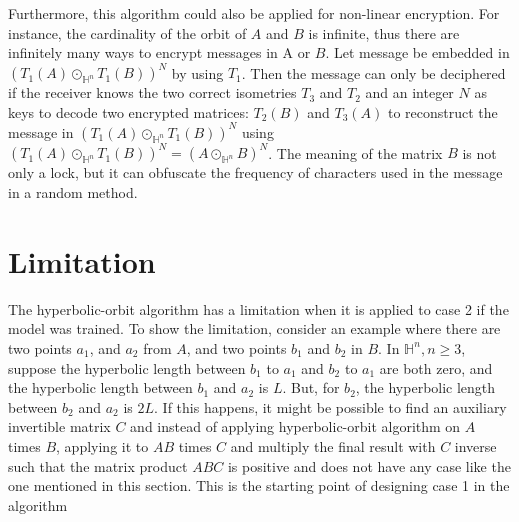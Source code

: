 \documentclass{article}
\theoremstyle{plain}
\theoremstyle{plain} %
\theoremstyle{definition}  %
\theoremstyle{remark}  %
\theoremstyle{plain}
\begin{document}
Furthermore, this algorithm could also be applied for non-linear encryption. For instance, the cardinality of the orbit of $A$ and $B$ is infinite, thus there are infinitely many ways to encrypt messages in A or $B$. Let message be embedded in $(T_1(A)\odot_{\mathbb{H}^n}T_1(B))^N$ by using $T_1$. Then the message can only be deciphered if the receiver knows the two correct isometries $T_3$ and $T_2$ and an integer $N$ as keys to decode two encrypted matrices: $T_2(B)$ and $T_3(A)$ to reconstruct the message in $(T_1(A)\odot_{\mathbb{H}^n}T_1(B))^N$ using $(T_1(A)\odot_{\mathbb{H}^n}T_1(B))^N = (A\odot_{\mathbb{H}^n}B)^N$. The meaning of the matrix $B$ is not only a lock, but it can obfuscate the frequency of characters used in the message in a random method.

\section{Limitation}
The hyperbolic-orbit algorithm has a limitation when it is applied to case 2 if the model was trained. To show the limitation, consider an example where there are two points $a_1$, and $a_2$ from $A$, and two points $b_1$ and $b_2$ in $B$. In $\mathbb{H}^n, n\geq 3$, suppose the hyperbolic length between $b_1$ to $a_1$ and $b_2$ to $a_1$ are both zero, and the hyperbolic length between $b_1$ and $a_2$ is $L$. But, for $b_2$, the hyperbolic length between $b_2$ and $a_2$ is $2L$. If this happens, it might be possible to find an auxiliary invertible matrix $C$ and instead of applying hyperbolic-orbit algorithm on $A$ times $B$, applying it to $AB$ times $C$ and multiply the final result with $C$ inverse such that the matrix product $ABC$ is positive and does not have any case like the one mentioned in this section. This is the starting point of designing case 1 in the algorithm

\end{document}
